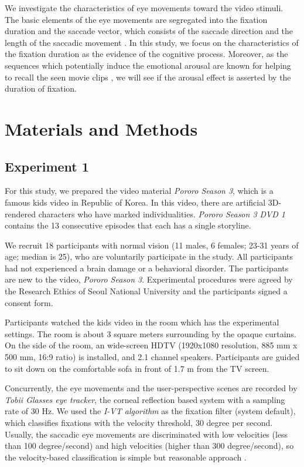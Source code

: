 \documentclass[10pt,letterpaper]{article}
\begin{document}
We investigate the characteristics of eye movements toward the video stimuli. The basic elements of the eye movements are segregated into the fixation duration and the saccade vector, which consists of the saccade direction and the length of the saccadic movement \cite{Findlay1999,Feng2006}. In this study, we focus on the characteristics of the fixation duration as the evidence of the cognitive process. Moreover, as the sequences which potentially induce the emotional arousal are known for helping to recall the seen movie clips \cite{Cahill1996amyg,Cahill1998baso}, we will see if the arousal effect is asserted by the duration of fixation.



\section{Materials and Methods}
\label{sec:material-and-methods}


\subsection{Experiment 1}

For this study, we prepared the video material \textit{Pororo Season 3}, which is a famous kids video in Republic of Korea. In this video, there are artificial 3D-rendered characters who have marked individualities. \textit{Pororo Season 3 DVD 1} contains the 13 consecutive episodes that each has a single storyline.

We recruit 18 participants with normal vision (11 males, 6 females; 23-31 years of age; median is 25), who are voluntarily participate in the study. All participants had not experienced a brain damage or a behavioral disorder. The participants are new to the video, \textit{Pororo Season 3}. Experimental procedures were agreed by the Research Ethics of Seoul National University and the participants signed a consent form.

Participants watched the kids video in the room which has the experimental settings. The room is about 3 square meters surrounding by the opaque curtains. On the side of the room, an wide-screen HDTV (1920x1080 resolution, 885 mm x 500 mm, 16:9 ratio) is installed, and 2.1 channel speakers. Participants are guided to sit down on the comfortable sofa in front of 1.7 m from the TV screen.

Concurrently, the eye movements and the user-perspective scenes are recorded by \textit{Tobii Glasses eye tracker}, the corneal reflection based system with a sampling rate of 30 Hz. We used the \textit{I-VT algorithm} as the fixation filter (system default), which classifies fixations with the velocity threshold, 30 degree per second. Usually, the saccadic eye movements are discriminated with low velocities (less than 100 degree/second) and high velocities (higher than 300 degree/second), so the velocity-based classification is simple but reasonable approach \cite{Salvucci2000}.
\end{document}
